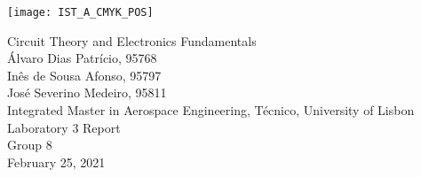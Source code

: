 
\thispagestyle {empty}

\texttt{[image: IST\_A\_CMYK\_POS]}

\begin{center}
%
\vspace{1.0cm}

\vspace{1cm}
{\FontLb Circuit Theory and Electronics Fundamentals} \\ %
\vspace{1.0cm}
{\FontSn Álvaro Dias Patrício, 95768} \\
\vspace{0.5cm}
{\FontSn Inês de Sousa Afonso, 95797} \\
\vspace{0.5cm}
{\FontSn José Severino Medeiro, 95811} \\
\vspace{1.0cm}
{\FontSn Integrated Master in Aerospace Engineering, Técnico, University of Lisbon} \\ %
\vspace{1.0cm}
{\FontSn Laboratory 3 Report} \\
\vspace{0.5cm}
{\FontSn Group 8} \\
\vspace{1.0cm}
{\FontSn February 25, 2021} \\ %
%
\end{center}

